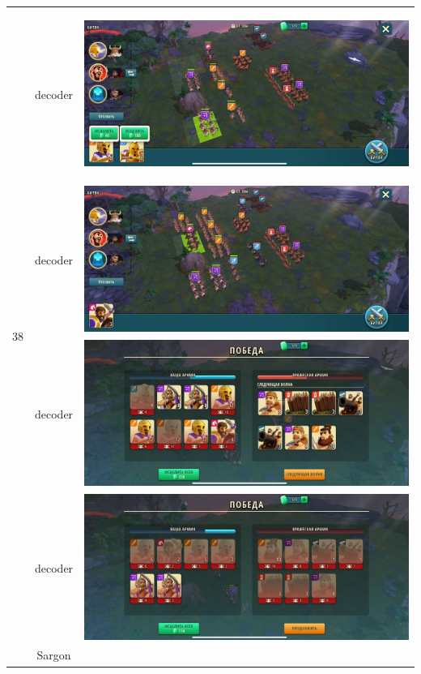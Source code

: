 \begin{longtable}{|c|c|c|}
    \hline
    \multirow{8}{*}{38} & decoder &
    \hypertarget{fight38}{\includegraphics[width=0.75\linewidth]{./parts/media/TreasureHunt/38/decoder/photo_2022-04-07_10-10-19.jpg}} \\
    & decoder &
    \includegraphics[width=0.75\linewidth]{./parts/media/TreasureHunt/38/decoder/photo_2022-04-07_10-10-01.jpg} \\
    & decoder &
    \includegraphics[width=0.75\linewidth]{./parts/media/TreasureHunt/38/decoder/photo_2022-04-07_10-10-16.jpg} \\
    & decoder &
    \includegraphics[width=0.75\linewidth]{./parts/media/TreasureHunt/38/decoder/photo_2022-04-07_10-10-23.jpg} \\
    \hline
    \multirow{8}{*}{38} & Sargon &

\end{longtable}
